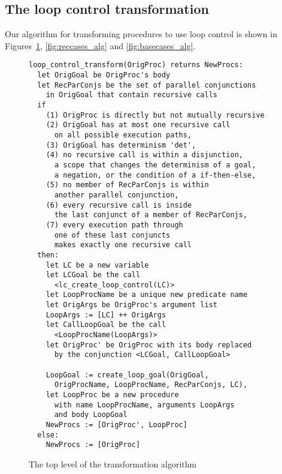

\subsection{The loop control transformation}
\label{sec:trans}

Our algorithm for transforming procedures to use loop control
is shown in Figures~\ref{fig:transform_alg},
\ref{fig:reccases_alg} and \ref{fig:basecases_alg}.

\begin{figure}[tb]
\begin{center}
{\small
\begin{verbatim}
loop_control_transform(OrigProc) returns NewProcs:
  let OrigGoal be OrigProc's body
  let RecParConjs be the set of parallel conjunctions
    in OrigGoal that contain recursive calls
  if
    (1) OrigProc is directly but not mutually recursive
    (2) OrigGoal has at most one recursive call
      on all possible execution paths,
    (3) OrigGoal has determinism 'det',
    (4) no recursive call is within a disjunction,
      a scope that changes the determinism of a goal,
      a negation, or the condition of a if-then-else,
    (5) no member of RecParConjs is within
      another parallel conjunction,
    (6) every recursive call is inside
      the last conjunct of a member of RecParConjs,
    (7) every execution path through
      one of these last conjuncts
      makes exactly one recursive call
  then:
    let LC be a new variable
    let LCGoal be the call
      <lc_create_loop_control(LC)>
    let LoopProcName be a unique new predicate name
    let OrigArgs be OrigProc's argument list
    LoopArgs := [LC] ++ OrigArgs
    let CallLoopGoal be the call
      <LoopProcName(LoopArgs)>
    let OrigProc' be OrigProc with its body replaced
      by the conjunction <LCGoal, CallLoopGoal>

    LoopGoal := create_loop_goal(OrigGoal,
      OrigProcName, LoopProcName, RecParConjs, LC),
    let LoopProc be a new procedure
      with name LoopProcName, arguments LoopArgs
      and body LoopGoal
    NewProcs := [OrigProc', LoopProc]
  else:
    NewProcs := [OrigProc]
\end{verbatim}
}
\end{center}
\caption{The top level of the transformation algorithm}
\label{fig:transform_alg}
\end{figure}

